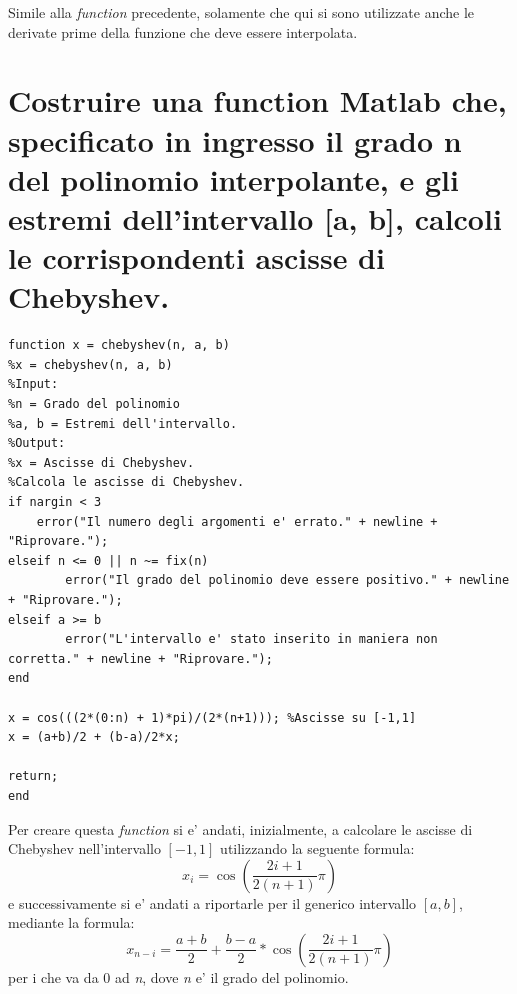 \documentclass[10pt,a4paper]{article}
\begin{document}
Simile alla \textit{function} precedente, solamente che qui si sono utilizzate
anche le derivate prime della funzione che deve essere interpolata.


\section{
Costruire una function Matlab che, specificato in ingresso il grado n del polinomio
interpolante, e gli estremi dell'intervallo [a, b], calcoli le corrispondenti ascisse di Chebyshev.
}
\begin{lstlisting}[style=Matlab-editor]
function x = chebyshev(n, a, b)
%x = chebyshev(n, a, b)
%Input:
%n = Grado del polinomio
%a, b = Estremi dell'intervallo.
%Output:
%x = Ascisse di Chebyshev.
%Calcola le ascisse di Chebyshev.
if nargin < 3
    error("Il numero degli argomenti e' errato." + newline + "Riprovare.");
elseif n <= 0 || n ~= fix(n)
        error("Il grado del polinomio deve essere positivo." + newline + "Riprovare.");
elseif a >= b
        error("L'intervallo e' stato inserito in maniera non corretta." + newline + "Riprovare.");
end

x = cos(((2*(0:n) + 1)*pi)/(2*(n+1))); %Ascisse su [-1,1]
x = (a+b)/2 + (b-a)/2*x;

return;
end
\end{lstlisting}

Per creare questa \textit{function} si e' andati, inizialmente, a calcolare le ascisse
di Chebyshev nell'intervallo $ [-1, 1] $ utilizzando la seguente formula: 
\[ x_i = \cos \left( \frac{2i + 1}{2(n+1)} \pi \right) \]
e successivamente si e' andati a riportarle per il generico intervallo $ [a, b] $, 
mediante la formula:
\[ x_{n-i} = \frac{a + b}{2} + \frac{b - a}{2} * \cos \left( \frac{2i + 1}{2(n+1)} \pi \right) \]
per i che va da 0 ad \textit{n}, dove \textit{n} e' il grado del polinomio.
\end{document}
